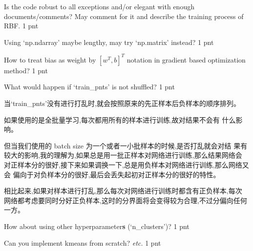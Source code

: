 \documentclass[12pt]{article}
\begin{document}
\begin{itemize}
		Is the code robust to all exceptions and/or elegant with enough documents/comments? May comment for it and describe the training process of RBF. 1 pnt 
		
		Using `np.ndarray' maybe lengthy, may try `np.matrix' instead? 1 pnt 
		
		How to treat bias as weight by $[w^T,b]^T$ notation in gradient based optimization method? 1 pnt 
		
		What would happen if `train\_pnts' is not shuffled? 1 pnt 
		
		当‘train\_pnts’没有进行打乱时,就会按照原来的先正样本后负样本的顺序排列。
		
		如果使用的是全批量学习,每次都用所有的样本进行训练,故对结果不会有
		什么影响。
		
		但当我们使用的 batch size 为一个或者一小批样本的时候,是否打乱就会对结
		果有较大的影响,我的理解为,如果总是用一批正样本对网络进行训练,那么结果网络会
		对正样本分的很好,接下来如果调换一下,总是用负样本对网络进行训练,那么网络又会
		偏向于对负样本分的很好,最后会丢失起初对正样本分的很好的特性。
		
		相比起来,如果对样本进行打乱,那么每次对网络进行训练时都含有正负样本,每次
		网络都考虑要同时分好正负样本,这时的分界面将会变得较为合理,不过分偏向任何一方。

		How about using other hyperparameter\textbf{s} (\eg `n\_clusters')? 1 pnt 
		
		

		Can you implement kmeans from scratch? \textit{etc.} 1 pnt 
\end{itemize}
\end{document}
